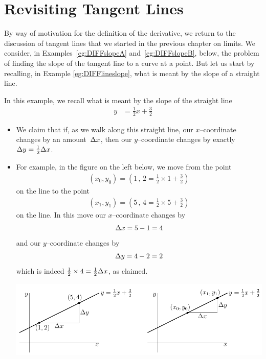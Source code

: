 \section{Revisiting Tangent Lines}


By way of motivation for the definition of the derivative, we return
to the discussion of tangent lines that we started in the previous
chapter on limits. We consider, in  Examples~\ref{eg:DIFFslopeA} and~\ref{eg:DIFFslopeB},
below, the problem of finding the slope of the tangent line to a curve at a point. But
let us start  by recalling, in Example \ref{eg:DIFFlineslope}, what is meant by the slope
of a straight line.
\begin{eg}\label{eg:DIFFlineslope}
In this example, we recall what is meant by the slope of the straight line
\begin{align*}
y&=\tfrac{1}{2}x+\tfrac{3}{2}
\end{align*}
\begin{itemize}
 \item We claim that if, as we walk along this straight line, our $x$--coordinate changes
by an amount~$\Delta x$, then our $y$--coordinate changes by exactly~$\Delta y =
\tfrac{1}{2}\Delta
x$.

\item For example, in the figure on the left below, we move from the point
\begin{align*}
(x_0,y_0)=(1\,,\,2=\tfrac{1}{2}\times 1+\tfrac{3}{2})
\end{align*}
on the line to the point
\begin{align*}
(x_1,y_1)=(5\,,\,4=\tfrac{1}{2}\times 5+\tfrac{3}{2})
\end{align*}
on the line. In this move our $x$--coordinate changes by
\begin{align*}
\Delta x= 5-1=4
\end{align*}
and our $y$--coordinate changes by
\begin{align*}
\Delta y=4-2=2
\end{align*}
which is indeed $\tfrac{1}{2}\times 4=\tfrac{1}{2}\Delta x$, as claimed.

\begin{wfig}
\begin{center}
    \includegraphics{slopeAB}
\end{center}
\end{wfig}


\end{itemize}
\end{eg}
